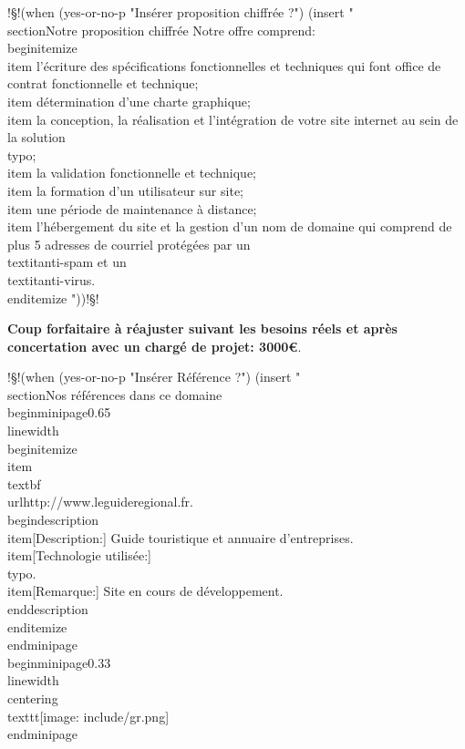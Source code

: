 \documentclass[]{extarticle}
\begin{document}
!§!(when  (yes-or-no-p "Insérer  proposition chiffrée ?")
(insert "\\section{Notre proposition chiffrée}
Notre offre comprend:
\\begin{itemize}
\\item l'écriture des spécifications fonctionnelles et techniques qui
  font office de contrat fonctionnelle et technique;
\\item détermination d'une charte graphique;
\\item la conception, la réalisation et l'intégration de votre site
  internet au sein de la solution \\typo;
\\item la validation fonctionnelle et technique;
\\item la formation d'un utilisateur sur site;
\\item une période de maintenance à distance;
\\item l'hébergement du site et la gestion d'un nom de domaine qui
  comprend de plus 5 adresses de courriel protégées par un
  \\textit{anti-spam} et un \\textit{anti-virus}.
\\end{itemize}
"))!§!

{\textbf{\Large Coup forfaitaire  à réajuster suivant
    les besoins réels et après concertation avec un chargé de projet: 3000€}.}

!§!(when  (yes-or-no-p "Insérer Référence ?")
(insert "
\\section{Nos références dans ce domaine}
\\begin{minipage}{0.65\\linewidth}
  \\begin{itemize}
  \\item \\textbf{\\url{http://www.leguideregional.fr}}.
    \\begin{description}
    \\item[Description:] Guide touristique et annuaire d'entreprises.
    \\item[Technologie utilisée:] \\typo.
    \\item[Remarque:] Site en cours de développement.
    \\end{description}
  \\end{itemize}
\\end{minipage}
\\begin{minipage}{0.33\\linewidth}
  \\centering
  \\texttt{[image: include/gr.png]}
\\end{minipage}
\end{document}
